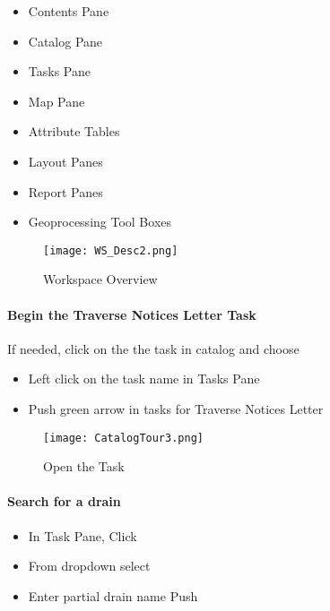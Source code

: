 \begin{itemize}
\item Contents Pane
\item Catalog Pane
\item Tasks Pane
\item Map Pane
\item Attribute Tables
\item Layout Panes
\item Report Panes
\item Geoprocessing Tool Boxes
\end{itemize}

\begin{figure}[h!]
 \centering
     \texttt{[image: WS\_Desc2.png]}
 \caption{Workspace Overview}
 \end{figure}

\clearpage

\paragraph{Begin the Traverse Notices Letter Task}
If needed, click on the the task in catalog and choose {\bigbtn{}}
\begin{itemize}

\item Left click on the task name in Tasks Pane
\item Push green arrow in tasks for Traverse Notices Letter

\end{itemize}
\begin{figure}[h!]
 \centering
     \texttt{[image: CatalogTour3.png]}
 \caption{Open the Task}
 \end{figure}


\clearpage

\paragraph{Search for a drain}

\begin{itemize}

\item In Task Pane, {\bigbtn Click } 
\item From dropdown select {\menuArrow}{\bigbtn {}}
\item Enter partial drain name {\menuArrow}{\bigbtn Push }

\end{itemize}

